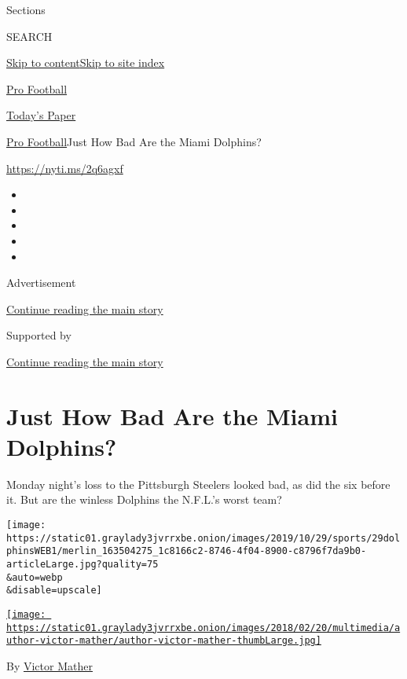 Sections

SEARCH

\protect\hyperlink{site-content}{Skip to
content}\protect\hyperlink{site-index}{Skip to site index}

\href{https://www.nytimes3xbfgragh.onion/section/sports/football}{Pro
Football}

\href{https://myaccount.nytimes3xbfgragh.onion/auth/login?response_type=cookie\&client_id=vi}{}

\href{https://www.nytimes3xbfgragh.onion/section/todayspaper}{Today's
Paper}

\href{/section/sports/football}{Pro Football}\textbar{}Just How Bad Are
the Miami Dolphins?

\url{https://nyti.ms/2q6agxf}

\begin{itemize}
\item
\item
\item
\item
\item
\end{itemize}

Advertisement

\protect\hyperlink{after-top}{Continue reading the main story}

Supported by

\protect\hyperlink{after-sponsor}{Continue reading the main story}

\hypertarget{just-how-bad-are-the-miami-dolphins}{%
\section{Just How Bad Are the Miami
Dolphins?}\label{just-how-bad-are-the-miami-dolphins}}

Monday night's loss to the Pittsburgh Steelers looked bad, as did the
six before it. But are the winless Dolphins the N.F.L.'s worst team?

\texttt{[image: https://static01.graylady3jvrrxbe.onion/images/2019/10/29/sports/29dolphinsWEB1/merlin\_163504275\_1c8166c2-8746-4f04-8900-c8796f7da9b0-articleLarge.jpg?quality=75\\\&auto=webp\\\&disable=upscale]}

\href{https://www.nytimes3xbfgragh.onion/by/victor-mather}{\texttt{[image: https://static01.graylady3jvrrxbe.onion/images/2018/02/20/multimedia/author-victor-mather/author-victor-mather-thumbLarge.jpg]}}

By \href{https://www.nytimes3xbfgragh.onion/by/victor-mather}{Victor
Mather}


